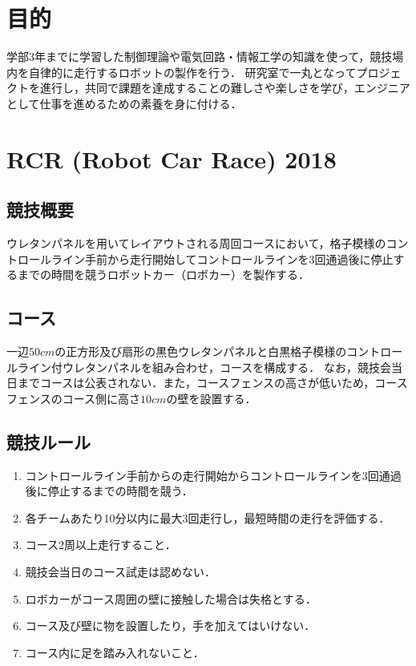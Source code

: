 \documentclass[11pt,a4j]{jarticle}
\begin{document}


\newpage
	\tableofcontents

\newpage
\section{目的}
	学部3年までに学習した制御理論や電気回路・情報工学の知識を使って，競技場内を自律的に走行するロボットの製作を行う．
	研究室で一丸となってプロジェクトを進行し，共同で課題を達成することの難しさや楽しさを学び，エンジニアとして仕事を進めるための素養を身に付ける．

\section{RCR (Robot Car Race) 2018}

\subsection{競技概要}
	ウレタンパネルを用いてレイアウトされる周回コースにおいて，格子模様のコントロールライン手前から走行開始してコントロールラインを3回通過後に停止するまでの時間を競うロボットカー（ロボカー）を製作する．

\subsection{コース}
	一辺$50\unit{cm}$の正方形及び扇形の黒色ウレタンパネルと白黒格子模様のコントロールライン付ウレタンパネルを組み合わせ，コースを構成する．
	なお，競技会当日までコースは公表されない．また，コースフェンスの高さが低いため，コースフェンスのコース側に高さ$10\unit{cm}$の壁を設置する．

\subsection{競技ルール}
	\begin{enumerate}
      \item コントロールライン手前からの走行開始からコントロールラインを3回通過後に停止するまでの時間を競う．
      \item 各チームあたり10分以内に最大3回走行し，最短時間の走行を評価する．
      \item コース2周以上走行すること．
      \item 競技会当日のコース試走は認めない．
      \item ロボカーがコース周囲の壁に接触した場合は失格とする．
      \item コース及び壁に物を設置したり，手を加えてはいけない．
      \item コース内に足を踏み入れないこと．
    \end{enumerate}
\end{document}

